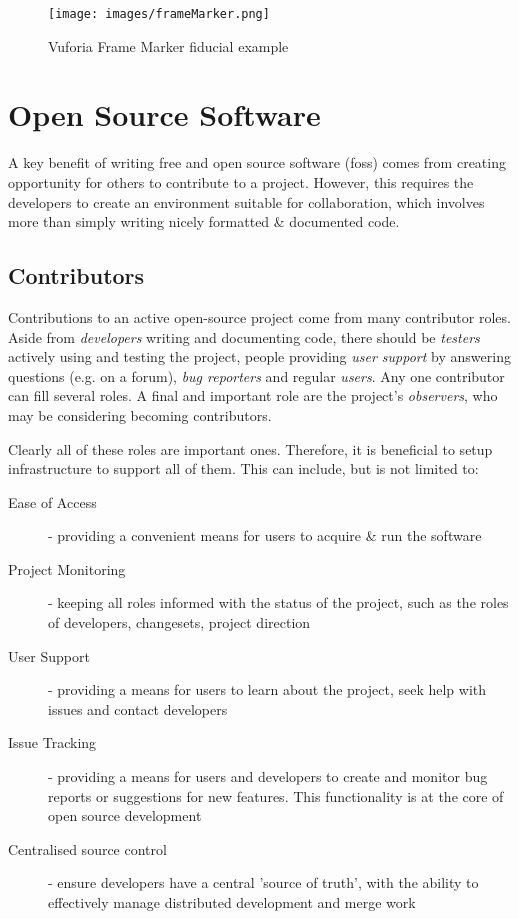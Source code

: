 \begin{figure}[ht!]
\centering
\texttt{[image: images/frameMarker.png]}
\caption{Vuforia Frame Marker fiducial example \cite{vuforia}}
\label{im:frameMarker}
\end{figure}

\clearpage




\section{Open Source Software}

A key benefit of writing free and open source software (\gls{foss}) comes from creating opportunity for others to contribute to a project. However, this requires the developers to create an environment suitable for collaboration, which involves more than simply writing nicely formatted \& documented code.
\\

\subsection{Contributors}

Contributions to an active open-source project come from many contributor roles. Aside from \textit{developers} writing and documenting code, there should be \textit{testers} actively using and testing the project, people providing \textit{user support} by answering questions (e.g. on a forum), \textit{bug reporters} and regular \textit{users}. Any one contributor can fill several roles. A final and important role are the project's \textit{observers}, who may be considering becoming contributors.

Clearly all of these roles are important ones. Therefore, it is beneficial to setup infrastructure to support all of them. This can include, but is not limited to:
\begin{description}
	\item[Ease of Access] - providing a convenient means for users to acquire \& run the software
	\item[Project Monitoring] - keeping all roles informed with the status of the project, such as the roles of developers, changesets, project direction
	\item[User Support] - providing a means for users to learn about the project, seek help with issues and contact developers
	\item[Issue Tracking] - providing a means for users and developers to create and monitor bug reports or suggestions for new features. This functionality is at the core of open source development
	\item[Centralised source control] - ensure developers have a central 'source of truth', with the ability to effectively manage distributed development and merge work
\end{description}

